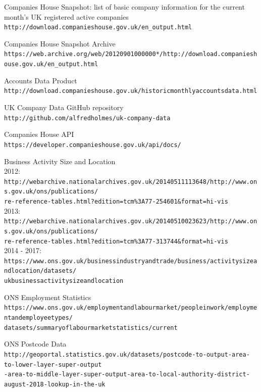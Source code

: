 \documentclass[a4paper,10pt]{article}
\begin{document}
   \begin{thebibliography}{9}
      Companies House Snapshot: list of basic company information for the current month's UK registered active companies
      \\\texttt{http://download.companieshouse.gov.uk/en\_output.html}

      Companies House Snapshot Archive
      \\\texttt{https://web.archive.org/web/20120901000000*/http://download.companieshouse.gov.uk/en\_output.html}

      Accounts Data Product
      \\\texttt{http://download.companieshouse.gov.uk/historicmonthlyaccountsdata.html}
      
      UK Company Data GitHub repository
      \\\texttt{http://github.com/alfredholmes/uk-company-data}

      Companies House API
      \\\texttt{https://developer.companieshouse.gov.uk/api/docs/}

      Business Activity Size and Location
      \\2012:
      \\\texttt{http://webarchive.nationalarchives.gov.uk/20140511113648/http://www.ons.gov.uk/ons/publications/\\re-reference-tables.html?edition=tcm\%3A77-254601\&format=hi-vis}
      \\2013:
      \\\texttt{http://webarchive.nationalarchives.gov.uk/20140510023623/http://www.ons.gov.uk/ons/publications/\\re-reference-tables.html?edition=tcm\%3A77-313744\&format=hi-vis}
      \\2014 - 2017:
      \\\texttt{https://www.ons.gov.uk/businessindustryandtrade/business/activitysizeandlocation/datasets/\\ukbusinessactivitysizeandlocation}
      
      
      ONS Employment Statistics
      \\\texttt{https://www.ons.gov.uk/employmentandlabourmarket/peopleinwork/employmentandemployeetypes/\\datasets/summaryoflabourmarketstatistics/current}

      ONS Postcode Data
      \\\texttt{http://geoportal.statistics.gov.uk/datasets/postcode-to-output-area-to-lower-layer-super-output\\-area-to-middle-layer-super-output-area-to-local-authority-district-august-2018-lookup-in-the-uk}

   \end{thebibliography}
\end{document}
